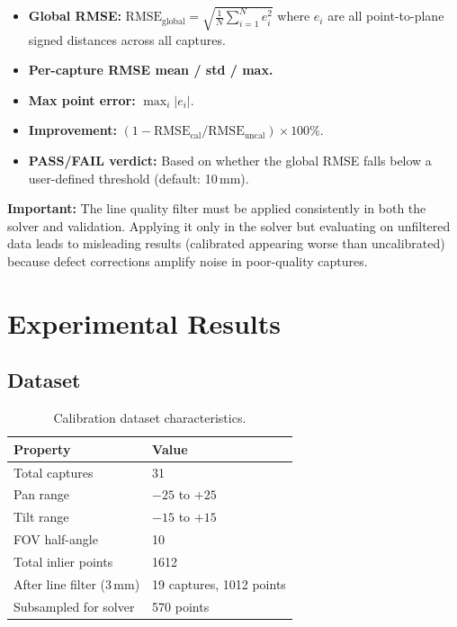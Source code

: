 \documentclass[12pt,a4paper]{article}
\begin{document}
\begin{itemize}[nosep]
    \item \textbf{Global RMSE:}
          $\text{RMSE}_{\text{global}} = \sqrt{\frac{1}{N}\sum_{i=1}^{N} e_i^2}$
          where $e_i$ are all point-to-plane signed distances across all captures.
    \item \textbf{Per-capture RMSE mean / std / max.}
    \item \textbf{Max point error:} $\max_i |e_i|$.
    \item \textbf{Improvement:} $(1 - \text{RMSE}_{\text{cal}} / \text{RMSE}_{\text{uncal}}) \times 100\%$.
    \item \textbf{PASS/FAIL verdict:} Based on whether the global RMSE falls
          below a user-defined threshold (default: 10\,mm).
\end{itemize}

\textbf{Important:} The line quality filter must be applied consistently
in both the solver and validation. Applying it only in the solver but
evaluating on unfiltered data leads to misleading results (calibrated
appearing worse than uncalibrated) because defect corrections amplify
noise in poor-quality captures.


\section{Experimental Results}
\label{sec:results}

\subsection{Dataset}

\begin{table}[H]
\centering
\caption{Calibration dataset characteristics.}
\label{tab:dataset}
\begin{tabular}{@{}ll@{}}
\toprule
Property & Value \\
\midrule
Total captures & 31 \\
Pan range & $-25$\textdegree{} to $+25$\textdegree{} \\
Tilt range & $-15$\textdegree{} to $+15$\textdegree{} \\
FOV half-angle & 10\textdegree{} \\
Total inlier points & 1612 \\
After line filter (3\,mm) & 19 captures, 1012 points \\
Subsampled for solver & 570 points \\
\bottomrule
\end{tabular}
\end{table}
\end{document}
